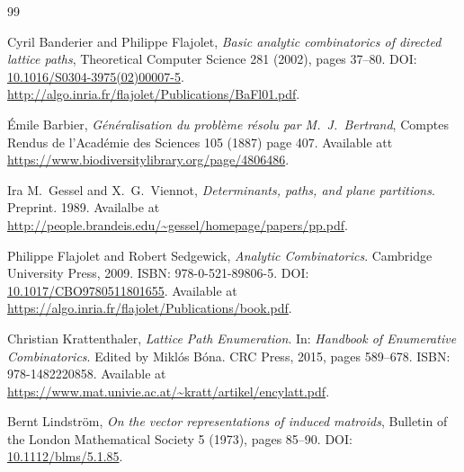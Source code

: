 \documentclass[10pt]{article}
\newcommand{\doi}[1]{\textsc{DOI}: \href{https://dx.doi.org/#1}{#1}}
\newcommand{\arxiv}[1]{arXiv: \href{https://arxiv.org/abs/#1}{#1}}
\begin{document}

\begin{thebibliography}{99}

Cyril Banderier and Philippe Flajolet, \emph{Basic analytic combinatorics of directed lattice paths}, Theoretical Computer Science 281 (2002), pages 37--80.  \doi{10.1016/S0304-3975(02)00007-5}.  \url{http://algo.inria.fr/flajolet/Publications/BaFl01.pdf}.


\'{E}mile Barbier, \emph{G\'{e}n\'{e}ralisation du probl\`{e}me r\'{e}solu par M.\ J.\ Bertrand}, Comptes Rendus de l'Acad\'{e}mie des Sciences 105 (1887) page 407.  Available att \url{https://www.biodiversitylibrary.org/page/4806486}.

Ira M.\ Gessel and X.\ G.\ Viennot, \emph{Determinants, paths, and plane partitions}.  Preprint.  1989.  Availalbe at \url{http://people.brandeis.edu/~gessel/homepage/papers/pp.pdf}.

Philippe Flajolet and Robert Sedgewick, \emph{Analytic Combinatorics}.  Cambridge University Press, 2009.  \textsc{ISBN}: 978-0-521-89806-5.  \doi{10.1017/CBO9780511801655}.  Available at \url{https://algo.inria.fr/flajolet/Publications/book.pdf}.


Christian Krattenthaler, \emph{Lattice Path Enumeration}.  In: \emph{Handbook of Enumerative Combinatorics}.  Edited by Mikl\'{o}s B\'{o}na.  CRC Press, 2015, pages 589--678.  \textsc{ISBN}: 978-1482220858.  Available at \url{https://www.mat.univie.ac.at/~kratt/artikel/encylatt.pdf}.

Bernt Lindstr\"{o}m, \emph{On the vector representations of induced matroids}, Bulletin of the London Mathematical Society 5 (1973), pages 85--90.  \doi{10.1112/blms/5.1.85}.


\end{thebibliography}
\end{document}
